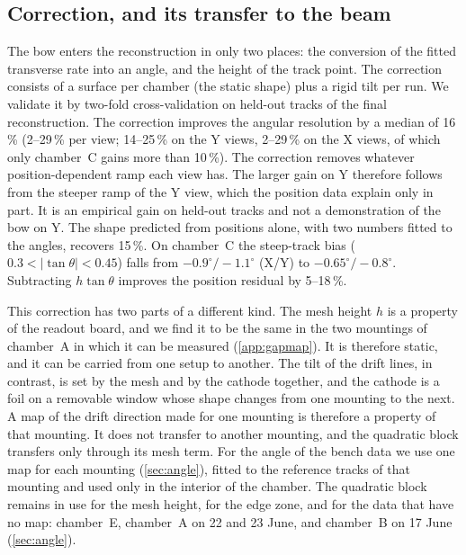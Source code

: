 \subsection{Correction, and its transfer to the beam}\label{sec:bowcorr}
The bow enters the reconstruction in only two places: the conversion of the fitted transverse rate into an angle, and
the height of the track point. The correction consists of a surface per chamber (the static shape) plus a rigid tilt
per run. We validate it by two-fold cross-validation on held-out tracks of the final reconstruction. The correction
improves the angular resolution by a median of 16\,\% (2--29\,\% per view; 14--25\,\% on the Y views, 2--29\,\% on the
X views, of which only chamber~C gains more than 10\,\%). The correction removes whatever position-dependent ramp each
view has. The larger gain on Y therefore follows from the steeper ramp of the Y view, which the position data explain
only in part. It is an empirical gain on held-out tracks and not a demonstration of the bow on Y. The shape predicted
from positions alone, with two numbers fitted to the angles, recovers 15\,\%. On chamber~C the steep-track bias
($0.3<|\tan\theta|<0.45$) falls from $-0.9^\circ/-1.1^\circ$ (X/Y) to $-0.65^\circ/-0.8^\circ$. Subtracting
$h\tan\theta$ improves the position residual by 5--18\,\%.

This correction has two parts of a different kind. The mesh height $h$ is a property of the readout board, and we find
it to be the same in the two mountings of chamber~A in which it can be measured (\cref{app:gapmap}). It is therefore
static, and it can be carried from one setup to another. The tilt of the drift lines, in contrast, is set by the mesh
and by the cathode together, and the cathode is a foil on a removable window whose shape changes from one mounting to
the next. A map of the drift direction made for one mounting is therefore a property of that mounting. It does not
transfer to another mounting, and the quadratic block transfers only through its mesh term. For the angle of the bench
data we use one map for each mounting (\cref{sec:angle}), fitted to the reference tracks of that mounting and used
only in the interior of the chamber. The quadratic block remains in use for the mesh height, for the edge zone, and
for the data that have no map: chamber~E, chamber~A on 22 and 23 June, and chamber~B on 17 June (\cref{sec:angle}).

